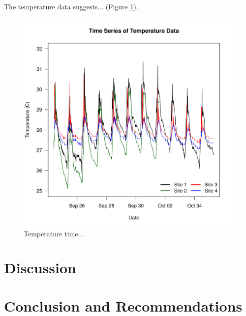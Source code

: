 \documentclass{article}
\begin{document}
The temperature data suggests... (Figure \ref{Temp}).

\begin{figure}
\includegraphics{Figures/Temp}
\caption{Temperature time...}
\label{Temp}
\end{figure}

\section{Discussion}


\section{Conclusion and Recommendations}
\end{document}
